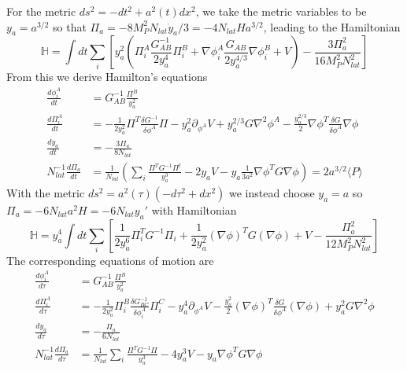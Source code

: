 \documentclass[a4paper,11pt]{article}
\begin{document}
For the metric $ds^2=-dt^2 + a^2(t)dx^2$, %
we take the metric variables to be $y_a = a^{3/2}$ so that $\Pi_a = -8M_P^2N_{lat}\dot{y}_a/3=-4N_{lat}Ha^{3/2}$, leading to the Hamiltonian
\begin{equation}
  \mathbb{H} = \int dt \sum_i \left[y_a^2\left(\Pi^A_i\frac{G^{-1}_{AB}}{2y_a^4}\Pi^B_i + \nabla\phi^A_i\frac{G_{AB}}{2y_a^{4/3}}\nabla\phi_i^B + V\right) - \frac{3\Pi_a^2}{16M_P^2N_{lat}^2} \right]
\end{equation}
From this we derive Hamilton's equations
\begin{align}
  \frac{d \phi^A_i}{dt} &= G^{-1}_{AB}\frac{\Pi^B}{y_a^2} \\
  \frac{d \Pi^A_i}{dt} &= -\frac{1}{2y_a^2}\Pi^T\frac{\delta G^{-1}}{\delta\phi^A}\Pi - y_a^2\partial_{\phi^A}V  + y_a^{2/3}G\nabla^2\phi^A - \frac{y_a^{2/3}}{2}\nabla\phi^T\frac{\delta G}{\delta \phi^A}\nabla\phi \\
  \frac{d y_a}{dt} &= -\frac{3\Pi_a}{8N_{lat}}  \\
  N_{lat}^{-1}\frac{d \Pi_a}{dt} &= \frac{1}{N_{lat}}\left(\sum_i \frac{\Pi^TG^{-1}\Pi^t}{y_a^3} - 2y_aV - y_a\frac{1}{3a^2}\nabla\phi^TG\nabla\phi \right) = 2a^{3/2} \langle P \rangle
\end{align}
With the metric $ds^2 = a^2(\tau)(-d\tau^2 + dx^2)$ %
we instead choose $y_a = a$ so $\Pi_a = -6N_{lat}a^2H = -6N_{lat}y_a'$
with Hamiltonian
\begin{equation}
  \mathbb{H} = y_a^4\int dt \sum_i \left[ \frac{1}{2y_a^6}\Pi_i^TG^{-1}\Pi_i + \frac{1}{2y_a^2}(\nabla\phi)^TG(\nabla\phi) + V - \frac{\Pi_a^2}{12M_P^2N_{lat}^2}\right]
\end{equation}
The corresponding equations of motion are
\begin{align}
  \frac{d \phi^A_i}{d\tau} &= G^{-1}_{AB}\frac{\Pi^B}{y_a^2} \\
  \frac{d \Pi^A_i}{d\tau} &= -\frac{1}{2y_a^2}\Pi^B_i\frac{\delta G^{-1}_{BC}}{\delta \phi_i^A}\Pi_i^C - y_a^4\partial_{\phi^A}V - \frac{y_a^2}{2}(\nabla\phi)^T\frac{\delta G}{\delta \phi^A}(\nabla\phi) + y_a^2G\nabla^2\phi\\
  \frac{d y_a}{d\tau} &= -\frac{\Pi_a}{6N_{lat}} \\
  N^{-1}_{lat}\frac{d \Pi_a}{d\tau} &= \frac{1}{N_{lat}}\sum_i \frac{\Pi^TG^{-1}\Pi}{y_a^3} - 4y_a^3V - y_a\nabla\phi^TG\nabla\phi
\end{align}
\end{document}

